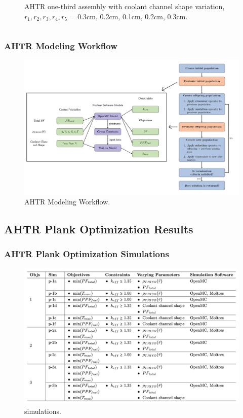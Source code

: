 \begin{frame}
\begin{columns}
\begin{column}{0.5\textwidth}
\begin{figure}
                \caption{AHTR one-third assembly with coolant channel shape variation, 
                $r_1, r_2, r_3, r_4, r_5$ = 0.3cm, 0.2cm, 0.1cm, 0.2cm, 0.3cm.}
            \end{figure}
        \end{column}
        \end{columns}
\end{frame}

\begin{frame}
    \frametitle{AHTR Modeling Workflow}
    \begin{figure}
        \includegraphics[width=0.95\linewidth]{figures/ahtr-modeling-workflow.png} 
        \caption{AHTR Modeling Workflow.}
    \end{figure}
\end{frame}

\subsection{AHTR Plank Optimization Results}

\begin{frame}
    \frametitle{AHTR Plank Optimization Simulations}
    \begin{figure}
        \includegraphics[width=0.95\linewidth]{figures/ahtr-plank-opt-table.png} 
        \caption{simulations.}
    \end{figure}
\end{frame}

